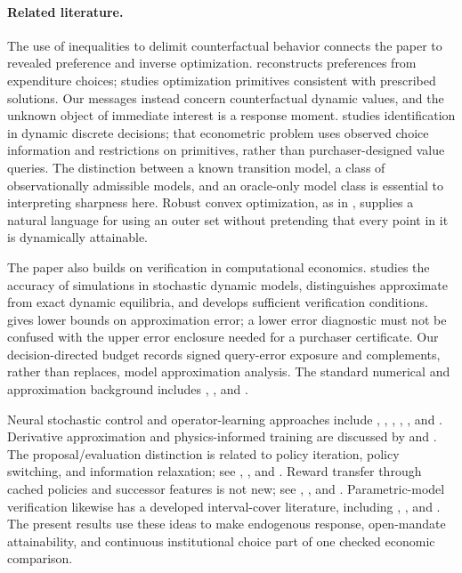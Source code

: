 \paragraph{Related literature.}
The use of inequalities to delimit counterfactual behavior connects the paper to revealed preference and inverse optimization. \citet{afriat1967} reconstructs preferences from expenditure choices; \citet{ahuja2001} studies optimization primitives consistent with prescribed solutions. Our messages instead concern counterfactual dynamic values, and the unknown object of immediate interest is a response moment. \citet{magnac2002} studies identification in dynamic discrete decisions; that econometric problem uses observed choice information and restrictions on primitives, rather than purchaser-designed value queries. The distinction between a known transition model, a class of observationally admissible models, and an oracle-only model class is essential to interpreting sharpness here. Robust convex optimization, as in \citet{bental1998}, supplies a natural language for using an outer set without pretending that every point in it is dynamically attainable.

The paper also builds on verification in computational economics. \citet{santos2005} studies the accuracy of simulations in stochastic dynamic models, \citet{kubler2005} distinguishes approximate from exact dynamic equilibria, and \citet{kubler2011} develops sufficient verification conditions. \citet{judd2017} gives lower bounds on approximation error; a lower error diagnostic must not be confused with the upper error enclosure needed for a purchaser certificate. Our decision-directed budget records signed query-error exposure and complements, rather than replaces, model approximation analysis. The standard numerical and approximation background includes \citet{judd1998}, \citet{stokey1989}, and \citet{barles1991}.

Neural stochastic control and operator-learning approaches include \citet{han2016}, \citet{han2018}, \citet{lee2024}, \citet{kim2025}, \citet{kim2026}, and \citet{cai2025}. Derivative approximation and physics-informed training are discussed by \citet{hornik1990} and \citet{raissi2019}. The proposal/evaluation distinction is related to policy iteration, policy switching, and information relaxation; see \citet{jacka2015}, \citet{chang2021}, and \citet{brown2010}. Reward transfer through cached policies and successor features is not new; see \citet{barreto2017}, \citet{nemecek2021}, and \citet{alegre2022}. Parametric-model verification likewise has a developed interval-cover literature, including \citet{quatmann2016}, \citet{junges2019}, and \citet{heck2025}. The present results use these ideas to make endogenous response, open-mandate attainability, and continuous institutional choice part of one checked economic comparison.

